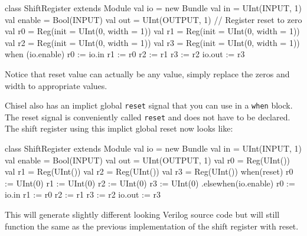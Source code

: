 \begin{scala}
class ShiftRegister extends Module {
  val io = new Bundle {
    val in     = UInt(INPUT, 1)
    val enable = Bool(INPUT)
    val out    = UInt(OUTPUT, 1)
  }
  // Register reset to zero
  val r0 = Reg(init = UInt(0, width = 1))
  val r1 = Reg(init = UInt(0, width = 1))
  val r2 = Reg(init = UInt(0, width = 1))
  val r3 = Reg(init = UInt(0, width = 1))
  when (io.enable) {
    r0 := io.in
    r1 := r0
    r2 := r1
    r3 := r2
  }
  io.out := r3
}
\end{scala}

Notice that reset value can actually be any value, simply replace the zeros and width to appropriate values.

Chisel also has an implict global \verb+reset+ signal that you can use in a \verb+when+ block. The reset signal is conveniently called \verb+reset+ and does not have to be declared. The shift register using this implict global reset now looks like:

\begin{scala}
class ShiftRegister extends Module {
  val io = new Bundle {
    val in     = UInt(INPUT, 1)
    val enable = Bool(INPUT)
    val out    = UInt(OUTPUT, 1)
  }
  val r0 = Reg(UInt())
  val r1 = Reg(UInt())
  val r2 = Reg(UInt())
  val r3 = Reg(UInt())
  when(reset) {
    r0 := UInt(0)
    r1 := UInt(0)
    r2 := UInt(0)
    r3 := UInt(0)
  } .elsewhen(io.enable) {
    r0 := io.in
    r1 := r0
    r2 := r1
    r3 := r2
  }
  io.out := r3
}
\end{scala}

This will generate slightly different looking Verilog source code but will still function the same as the previous implementation of the shift register with reset.



%
%
%
%
